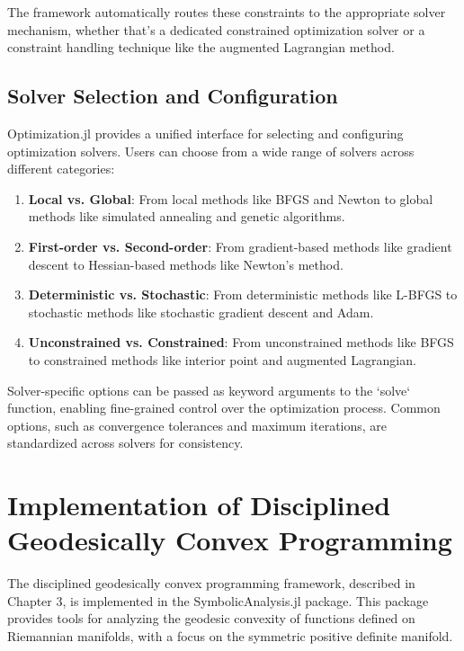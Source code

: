 The framework automatically routes these constraints to the appropriate solver mechanism, whether that's a dedicated constrained optimization solver or a constraint handling technique like the augmented Lagrangian method.

\subsection{Solver Selection and Configuration}

Optimization.jl provides a unified interface for selecting and configuring optimization solvers. Users can choose from a wide range of solvers across different categories:

\begin{enumerate}
\item \textbf{Local vs. Global}: From local methods like BFGS and Newton to global methods like simulated annealing and genetic algorithms.

\item \textbf{First-order vs. Second-order}: From gradient-based methods like gradient descent to Hessian-based methods like Newton's method.

\item \textbf{Deterministic vs. Stochastic}: From deterministic methods like L-BFGS to stochastic methods like stochastic gradient descent and Adam.

\item \textbf{Unconstrained vs. Constrained}: From unconstrained methods like BFGS to constrained methods like interior point and augmented Lagrangian.
\end{enumerate}

Solver-specific options can be passed as keyword arguments to the `solve` function, enabling fine-grained control over the optimization process. Common options, such as convergence tolerances and maximum iterations, are standardized across solvers for consistency.

\section{Implementation of Disciplined Geodesically Convex Programming}

The disciplined geodesically convex programming framework, described in Chapter 3, is implemented in the SymbolicAnalysis.jl package. This package provides tools for analyzing the geodesic convexity of functions defined on Riemannian manifolds, with a focus on the symmetric positive definite manifold.

